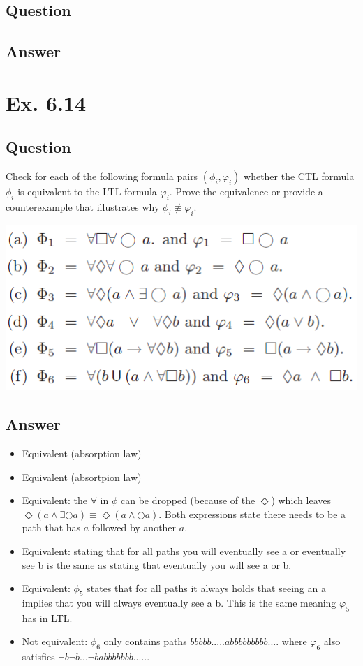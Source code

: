 \documentclass[12pt]{article}
\begin{document}
\subsection*{Question}

\subsection*{Answer}

\newpage
\section*{Ex. 6.14}
\subsection*{Question}
Check for each of the following formula pairs $(\phi_i, \varphi_i)$ whether the CTL formula $\phi_i$ is equivalent to the LTL formula $\varphi_i$. Prove the equivalence or provide a counterexample that illustrates why $\phi_i \not\equiv \varphi_i$.
\begin{center}
	\includegraphics*[scale=0.8]{ex614.png}
\end{center}

\subsection*{Answer}
\begin{itemize}
	\item Equivalent (absorption law)
	\item Equivalent (absortpion law)
	\item Equivalent: the $\forall$ in $\phi$ can be dropped (because of the $\Diamond$) which leaves $\Diamond(a\wedge\exists\Circle a) \equiv \Diamond(a\wedge\Circle a)$. Both expressions state there needs to be a path that has $a$ followed by another $a$.
	\item Equivalent: stating that for all paths you will eventually see a or eventually see b is the same as stating that eventually you will see a or b.
	\item Equivalent: $\phi_5$ states that for all paths it always holds that seeing an a implies that you will always eventually see a b. This is the same meaning $\varphi_5$ has in LTL.
	\item Not equivalent: $\phi_6$ only contains paths $bbbbb.....abbbbbbbbb....$ where $\varphi_6$ also satisfies $\neg b\neg b ... \neg babbbbbbb.....$.
\end{itemize}
\end{document}
